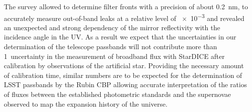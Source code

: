 The survey allowed to determine filter fronts with a precision of
about 0.2~nm, to accurately measure out-of-band leaks at a relative
level of \num{e-3} and revealed an unexpected and strong dependency of
the mirror reflectivity with the incidence angle in the UV. As a
result we expect that the uncertainties in our determination of the
telescope passbands will not contribute more than 1\textperthousand\
uncertainty in the measurement of broadband flux with StarDICE after
calibration by observations of the artificial star. Providing the
necessary amount of calibration time, similar numbers are to be
expected for the determination of LSST passbands by the Rubin CBP
allowing accurate interpretation of the ratios of fluxes between the
established photometric standards and the supernovae observed to map
the expansion history of the universe.

